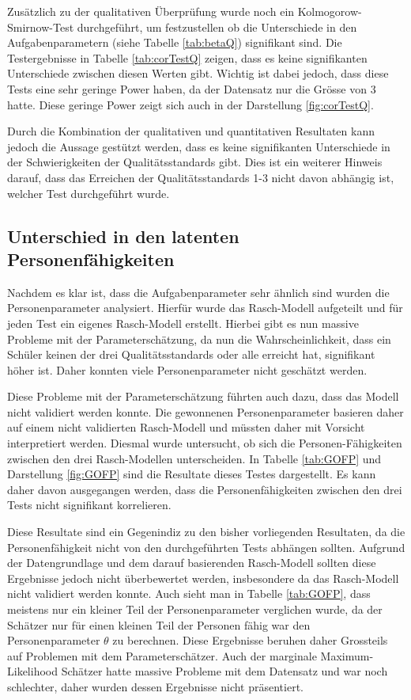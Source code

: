 Zusätzlich zu der qualitativen Überprüfung wurde noch ein Kolmogorow-Smirnow-Test durchgeführt, um festzustellen ob die Unterschiede in den Aufgabenparametern (siehe Tabelle \ref{tab:betaQ}) signifikant sind. Die Testergebnisse in Tabelle \ref{tab:corTestQ} zeigen, dass es keine signifikanten Unterschiede zwischen diesen Werten gibt. Wichtig ist dabei jedoch, dass diese Tests eine sehr geringe Power haben, da der Datensatz nur die Grösse von 3 hatte. Diese geringe Power zeigt sich auch in der Darstellung \ref{fig:corTestQ}.


Durch die Kombination der qualitativen und quantitativen Resultaten kann jedoch die Aussage gestützt werden, dass es keine signifikanten Unterschiede in der Schwierigkeiten der Qualitätsstandards gibt. Dies ist ein weiterer Hinweis darauf, dass das Erreichen der Qualitätsstandards 1-3 nicht davon abhängig ist, welcher Test durchgeführt wurde. 

\subsection{Unterschied in den latenten Personenfähigkeiten}

Nachdem es klar ist, dass die Aufgabenparameter sehr ähnlich sind wurden die Personenparameter analysiert. Hierfür wurde das Rasch-Modell aufgeteilt und für jeden Test ein eigenes Rasch-Modell erstellt. Hierbei gibt es nun massive Probleme mit der Parameterschätzung, da nun die Wahrscheinlichkeit, dass ein Schüler keinen der drei Qualitätsstandards oder alle erreicht hat, signifikant höher ist. Daher konnten viele Personenparameter nicht geschätzt werden.

Diese Probleme mit der Parameterschätzung führten auch dazu, dass das Modell nicht validiert werden konnte. Die gewonnenen Personenparameter basieren daher auf einem nicht validierten Rasch-Modell und müssten daher mit Vorsicht interpretiert werden. Diesmal wurde untersucht, ob sich die Personen-Fähigkeiten zwischen den drei Rasch-Modellen unterscheiden. In Tabelle \ref{tab:GOFP} und Darstellung \ref{fig:GOFP} sind die Resultate dieses Testes dargestellt. Es kann daher davon ausgegangen werden, dass die Personenfähigkeiten zwischen den drei Tests nicht signifikant korrelieren.

Diese Resultate sind ein Gegenindiz zu den bisher vorliegenden Resultaten, da die Personenfähigkeit nicht von den durchgeführten Tests abhängen sollten. Aufgrund der Datengrundlage und dem darauf basierenden Rasch-Modell sollten diese Ergebnisse jedoch nicht überbewertet werden, insbesondere da das Rasch-Modell nicht validiert werden konnte. Auch sieht man in Tabelle \ref{tab:GOFP}, dass meistens nur ein kleiner Teil der Personenparameter verglichen wurde, da der Schätzer nur für einen kleinen Teil der Personen fähig war den Personenparameter $\theta$ zu berechnen. Diese Ergebnisse beruhen daher Grossteils auf Problemen mit dem Parameterschätzer. Auch der marginale Maximum-Likelihood Schätzer hatte massive Probleme mit dem Datensatz und war noch schlechter, daher wurden dessen Ergebnisse nicht präsentiert.

